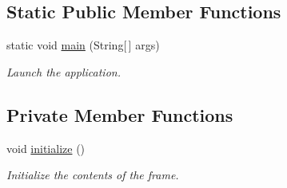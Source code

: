 \subsection*{Static Public Member Functions}
\begin{DoxyCompactItemize}
\item 
static void \hyperlink{classTrackModel_1_1TrackGUI_ae0ea094a8dc49fd550f92a4ad64918d3}{main} (String\mbox{[}$\,$\mbox{]} args)
\begin{DoxyCompactList}\small\item\em Launch the application. \end{DoxyCompactList}\end{DoxyCompactItemize}
\subsection*{Private Member Functions}
\begin{DoxyCompactItemize}
\item 
void \hyperlink{classTrackModel_1_1TrackGUI_a8e4a5b8c6812d1562bd92323025b0f76}{initialize} ()
\begin{DoxyCompactList}\small\item\em Initialize the contents of the frame. \end{DoxyCompactList}\end{DoxyCompactItemize}

